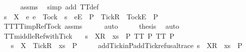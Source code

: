 \ \ \ \ \isamarkupfalse%
\ assms\ \isamarkupfalse%
\ {\isacharparenleft}simp\ add{\isacharcolon}\ TT{}{\isacharunderscore}def{\isacharparenright}\ \isanewline
\ \ \isamarkupfalse%
\ \isamarkupfalse%
\ {\isachardoublequoteopen}s\ {\isacharat}\ {\isacharbrackleft}{\isacharbrackleft}X\ {\isasymunion}\ {\isacharbraceleft}e{\isachardot}\ e\ {\isasymnoteq}\ Tock\ {\isasymand}\ s\ {\isacharat}\ {\isacharbrackleft}{\isacharbrackleft}e{\isacharbrackright}\isactrlsub E{\isacharbrackright}\ {\isasymnotin}\ P{\isacharbraceright}\ {\isasymunion}\ {\isacharbraceleft}Tick{\isacharbraceright}{\isacharbrackright}\isactrlsub R{\isacharbrackright}\ {\isacharat}\ {\isacharbrackleft}{\isacharbrackleft}Tock{\isacharbrackright}\isactrlsub E{\isacharbrackright}\ {\isasymin}\ P{\isachardoublequoteclose}\isanewline
\ \ \ \ \isamarkupfalse%
\ TT{}{\isacharunderscore}TT{}{\isacharunderscore}imp{\isacharunderscore}Ref{\isacharunderscore}Tock\ assms\isanewline
\ \ \ \ \isamarkupfalse%
\ auto\isanewline
\ \ \isamarkupfalse%
\ \isamarkupfalse%
\ {\isacharquery}thesis\ \isamarkupfalse%
\ auto\isanewline
{}\isamarkupfalse%
%
\endisatagproof
{\isafoldproof}%
%
\isadelimproof
\isanewline
%
\endisadelimproof
\isanewline
{}\isamarkupfalse%
\ TT{}{\isacharunderscore}middle{\isacharunderscore}Ref{\isacharunderscore}with{\isacharunderscore}Tick{\isacharcolon}\isanewline
\ \ \ {\isachardoublequoteopen}s\ {\isacharat}\ {\isacharbrackleft}{\isacharbrackleft}X{\isacharbrackright}\isactrlsub R{\isacharbrackright}\ {\isacharat}\ xs\ {\isasymin}\ P{\isachardoublequoteclose}\ {\isachardoublequoteopen}TT{}\ P{\isachardoublequoteclose}\ {\isachardoublequoteopen}TT{}\ P{\isachardoublequoteclose}\isanewline
\ \ \ {\isachardoublequoteopen}s\ {\isacharat}\ {\isacharbrackleft}{\isacharbrackleft}X\ {\isasymunion}\ {\isacharbraceleft}Tick{\isacharbraceright}{\isacharbrackright}\isactrlsub R{\isacharbrackright}\ {\isacharat}\ xs\ {\isasymin}\ P{\isachardoublequoteclose}\isanewline
%
\isadelimproof
%
\endisadelimproof
%
\isatagproof
{}\isamarkupfalse%
\ {\isacharminus}\isanewline
\ \ \isamarkupfalse%
\ add{\isacharunderscore}Tick{\isacharunderscore}in{\isacharunderscore}P{\isacharcolon}{\isachardoublequoteopen}add{\isacharunderscore}Tick{\isacharunderscore}refusal{\isacharunderscore}trace\ {\isacharparenleft}s\ {\isacharat}\ {\isacharbrackleft}{\isacharbrackleft}X{\isacharbrackright}\isactrlsub R{\isacharbrackright}\ {\isacharat}\ xs{\isacharparenright}\ {\isasymin}\ P{\isachardoublequoteclose}\isanewline
